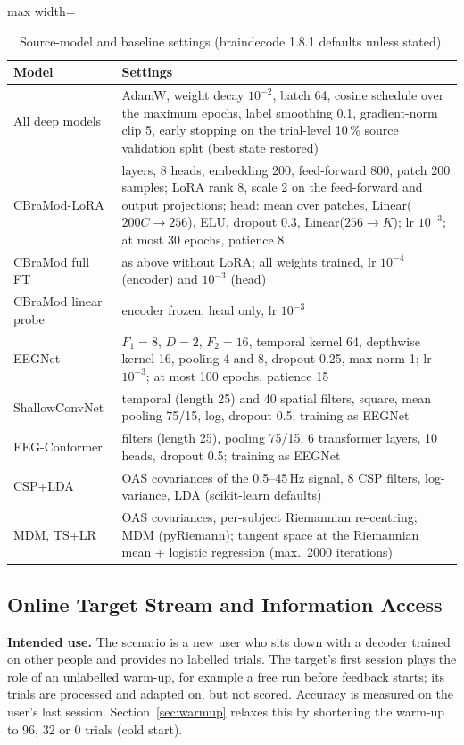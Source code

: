 \documentclass[preprint,12pt]{elsarticle}
\newcommand{\rev}[1]{#1}
\newcommand{\revfloat}{}
\begin{document}
\begin{table}[!htbp]
\centering
\caption{\rev{Source-model and baseline settings (braindecode 1.8.1 defaults unless stated).}}
\label{tab:settings}
\revfloat
\setlength{\tabcolsep}{3pt}
\begin{adjustbox}{max width=\textwidth}
\begin{tabular}{@{}>{\raggedright\arraybackslash}p{3.0cm}>{\raggedright\arraybackslash}p{9.8cm}@{}}
\toprule
Model & Settings \\
\midrule
All deep models & AdamW, weight decay $10^{-2}$, batch 64, cosine schedule over the maximum epochs, label smoothing 0.1, gradient-norm clip 5, early stopping on the trial-level 10\,\% source validation split (best state restored) \\
CBraMod-LoRA & 12 layers, 8 heads, embedding 200, feed-forward 800, patch 200 samples; LoRA rank 8, scale 2 on the feed-forward and output projections; head: mean over patches, Linear($200C\to256$), ELU, dropout 0.3, Linear($256\to K$); lr $10^{-3}$; at most 30 epochs, patience 8 \\
CBraMod full FT & as above without LoRA; all weights trained, lr $10^{-4}$ (encoder) and $10^{-3}$ (head) \\
CBraMod linear probe & encoder frozen; head only, lr $10^{-3}$ \\
EEGNet & $F_1=8$, $D=2$, $F_2=16$, temporal kernel 64, depthwise kernel 16, pooling 4 and 8, dropout 0.25, max-norm 1; lr $10^{-3}$; at most 100 epochs, patience 15 \\
ShallowConvNet & 40 temporal (length 25) and 40 spatial filters, square, mean pooling 75/15, log, dropout 0.5; training as EEGNet \\
EEG-Conformer & 40 filters (length 25), pooling 75/15, 6 transformer layers, 10 heads, dropout 0.5; training as EEGNet \\
CSP+LDA & OAS covariances of the 0.5--45\,Hz signal, 8 CSP filters, log-variance, LDA (scikit-learn defaults) \\
MDM, TS+LR & OAS covariances, per-subject Riemannian re-centring; MDM (pyRiemann); tangent space at the Riemannian mean + logistic regression (max.\ 2000 iterations) \\
\bottomrule
\end{tabular}
\end{adjustbox}
\end{table}


\subsection{Online Target Stream \rev{and Information Access}}\label{sec:stream}
\rev{\textbf{Intended use.} The scenario is a new user who sits down with a decoder trained on other people and provides no labelled trials. The target's first session plays the role of an unlabelled warm-up, for example a free run before feedback starts; its trials are processed and adapted on, but not scored. Accuracy is measured on the user's last session. Section~\ref{sec:warmup} relaxes this by shortening the warm-up to 96, 32 or 0 trials (cold start).}
\end{document}
